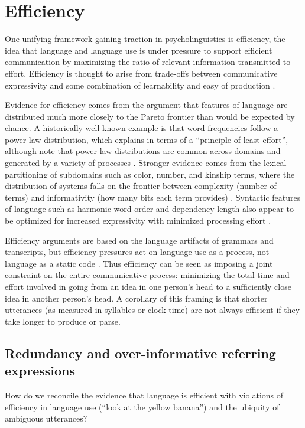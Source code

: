 \documentclass[]{article}
\begin{document}
\section{Efficiency}


One unifying framework gaining traction in psycholinguistics is efficiency, the idea that language and language use is under pressure to support efficient communication by maximizing the ratio of relevant information transmitted to effort. Efficiency is thought to arise from trade-offs between communicative expressivity and some combination of learnability and easy of production \citep{piantadosi2012, kirby2015}. 

Evidence for efficiency comes from the argument that features of language are distributed much more closely to the Pareto frontier than would be expected by chance. A historically well-known example is that word frequencies follow a power-law distribution, which \cite{zipf1949} explains in terms of a ``principle of least effort'', although note that power-law distributions are common across domains and generated by a variety of processes \cite{piantadosi2014}. Stronger evidence comes from the lexical partitioning of subdomains such as color, number, and kinship terms, where the distribution of systems falls on the frontier between complexity (number of terms) and informativity (how many bits each term provides) \citep{zaslavsky2018, kemp2018, gibson2019}. Syntactic features of language such as harmonic word order and dependency length also appear to be optimized for increased expressivity with minimized processing effort \citep{gibson2019, hawkins1995}. 
	
Efficiency arguments are based on the language artifacts of grammars and transcripts, but efficiency pressures act on language use as a process, not language as a static code \citep{gibson2019}. Thus efficiency can be seen as imposing a joint constraint on the entire communicative process: minimizing the total time and effort involved in going from an idea in one person's head to a sufficiently close idea in another person's head. A corollary of this framing is that shorter utterances (as measured in syllables or clock-time) are not always efficient if they take longer to produce or parse. 



\subsection{Redundancy and over-informative referring expressions}
How do we reconcile the evidence that language is efficient with violations of efficiency in language use (``look at the yellow banana'') and the ubiquity of ambiguous utterances?
\end{document}

